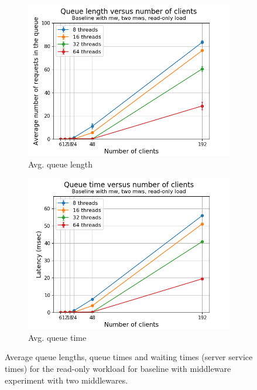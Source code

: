 \documentclass[11pt,a4paper]{article}
\begin{document}
\begin{figure}[h]
\centering
\begin{subfigure}{.5\textwidth}
  \centering
  \includegraphics[width=1.0\linewidth,trim={5px 0px 20px 0px},clip]{img/plot/mwb2-ro-qlen_mw.png}
  \caption{Avg. queue length}
  \label{fig:mwb2-ro-qlen_mw}
\end{subfigure}%
\begin{subfigure}{.5\textwidth}
  \centering
  \includegraphics[width=1.0\linewidth,trim={5px 0px 20px 0px},clip]{img/plot/mwb2-ro-qtime_mw.png}
  \caption{Avg. queue time}
  \label{fig:mwb2-ro-qtime_mw}
\end{subfigure}
\caption{Average queue lengths, queue times and waiting times (server service times) for the read-only workload for baseline with middleware experiment with two middlewares.}
\label{fig:mwb2-ro-qstats}
\end{figure}
\end{document}
